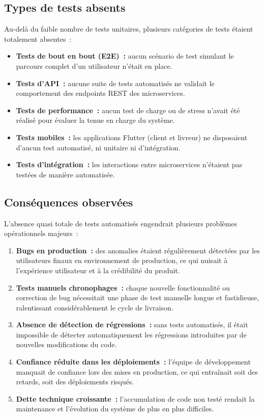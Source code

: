 \subsection{Types de tests absents}
\label{subsec:types-tests-absents}

Au-delà du faible nombre de tests unitaires, plusieurs catégories de tests étaient totalement absentes~:

\begin{itemize}
    \item \textbf{Tests de bout en bout (E2E)~:} aucun scénario de test simulant le parcours complet d'un utilisateur n'était en place.
    \item \textbf{Tests d'API~:} aucune suite de tests automatisés ne validait le comportement des endpoints REST des microservices.
    \item \textbf{Tests de performance~:} aucun test de charge ou de stress n'avait été réalisé pour évaluer la tenue en charge du système.
    \item \textbf{Tests mobiles~:} les applications Flutter (client et livreur) ne disposaient d'aucun test automatisé, ni unitaire ni d'intégration.
    \item \textbf{Tests d'intégration~:} les interactions entre microservices n'étaient pas testées de manière automatisée.
\end{itemize}

\subsection{Conséquences observées}
\label{subsec:consequences-observees}

L'absence quasi totale de tests automatisés engendrait plusieurs problèmes opérationnels majeurs~:

\begin{enumerate}
    \item \textbf{Bugs en production~:} des anomalies étaient régulièrement détectées par les utilisateurs finaux en environnement de production, ce qui nuisait à l'expérience utilisateur et à la crédibilité du produit.
    \item \textbf{Tests manuels chronophages~:} chaque nouvelle fonctionnalité ou correction de bug nécessitait une phase de test manuelle longue et fastidieuse, ralentissant considérablement le cycle de livraison.
    \item \textbf{Absence de détection de régressions~:} sans tests automatisés, il était impossible de détecter automatiquement les régressions introduites par de nouvelles modifications du code.
    \item \textbf{Confiance réduite dans les déploiements~:} l'équipe de développement manquait de confiance lors des mises en production, ce qui entraînait soit des retards, soit des déploiements risqués.
    \item \textbf{Dette technique croissante~:} l'accumulation de code non testé rendait la maintenance et l'évolution du système de plus en plus difficiles.
\end{enumerate}

